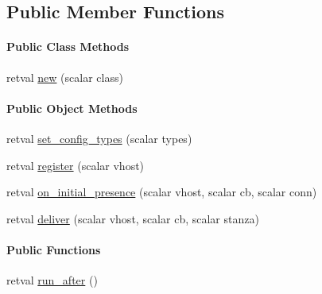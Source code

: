 \subsection*{\-Public \-Member \-Functions}
\begin{Indent}\paragraph*{\-Public \-Class \-Methods}
\begin{DoxyCompactItemize}
\item 
retval \hyperlink{class_d_jabberd_1_1_delivery_1_1_offline_storage_a04de1185dad12c1c24cac9235c2bbeff}{new} (scalar class)
\end{DoxyCompactItemize}
\end{Indent}
\begin{Indent}\paragraph*{\-Public \-Object \-Methods}
\begin{DoxyCompactItemize}
\item 
retval \hyperlink{class_d_jabberd_1_1_delivery_1_1_offline_storage_a2b80c6a98382828f38f5e59b55ef7734}{set\-\_\-config\-\_\-types} (scalar types)
\item 
retval \hyperlink{class_d_jabberd_1_1_delivery_1_1_offline_storage_ad74fd0b541e604cd2a3dd55e48bb8fde}{register} (scalar vhost)
\item 
retval \hyperlink{class_d_jabberd_1_1_delivery_1_1_offline_storage_aa2aafa5cbaa23130d0485b1de502a5c3}{on\-\_\-initial\-\_\-presence} (scalar vhost, scalar cb, scalar conn)
\item 
retval \hyperlink{class_d_jabberd_1_1_delivery_1_1_offline_storage_a2346eca32155d08c609667965942ef9b}{deliver} (scalar vhost, scalar cb, scalar stanza)
\end{DoxyCompactItemize}
\end{Indent}
\begin{Indent}\paragraph*{\-Public \-Functions}
\begin{DoxyCompactItemize}
\item 
retval \hyperlink{class_d_jabberd_1_1_delivery_1_1_offline_storage_a499abe180750985dc63b2a2e7cf4645d}{run\-\_\-after} ()
\end{DoxyCompactItemize}
\end{Indent}


